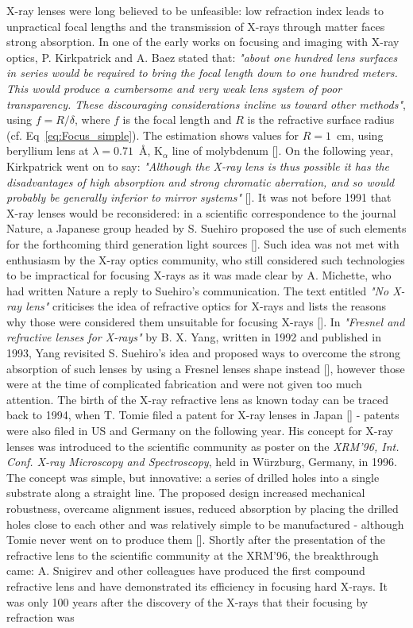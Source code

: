 \begin{refsection}
X-ray lenses were long believed to be unfeasible: low refraction index leads to unpractical focal lengths and the transmission of X-rays through matter faces strong absorption. In one of the early works on focusing and imaging with X-ray optics, P. Kirkpatrick and A. Baez stated that: \textit{"about one hundred lens surfaces in series would be required to bring the focal length down to one hundred meters. This would produce a cumbersome and very weak lens system of poor transparency. These discouraging considerations incline us toward other methods"}, using $f=R/\delta$, where $f$ is the focal length and $R$ is the refractive surface radius (cf. Eq~\ref{eq:Focus_simple}). The estimation shows values for $R=1$~cm, using beryllium lens at $\lambda=0.71$~\r{A}, K$_{\alpha}$ line of molybdenum [\cite{Kirkpatrick1948}]. On the following year, Kirkpatrick went on to say: \textit{"Although the X-ray lens is thus possible it has the disadvantages of high absorption and strong chromatic aberration, and so would probably be generally inferior to mirror systems"} [\cite{Kirkpatrick1949}]. It was not before 1991 that X-ray lenses would be reconsidered: in a scientific correspondence to the journal Nature, a Japanese group headed by S. Suehiro proposed the use of such elements for the forthcoming third generation light sources [\cite{Suehiro1991}]. Such idea was not met with enthusiasm by the X-ray optics community, who still considered such technologies to be impractical for focusing X-rays as it was made clear by A. Michette, who had written Nature a reply to Suehiro's communication. The text entitled \textit{"No X-ray lens"} criticises the idea of refractive optics for X-rays and lists the reasons why those were considered them unsuitable for focusing X-rays [\cite{Michette1991}]. In \textit{"Fresnel and refractive lenses for X-rays"} by B. X. Yang, written in 1992 and published in 1993, Yang revisited S. Suehiro's idea and proposed ways to overcome the strong absorption of such lenses by using a Fresnel lenses shape instead [\cite{Yang1993}], however those were at the time of complicated fabrication and were not given too much attention. The birth of the X-ray refractive lens as known today can be traced back to 1994, when T. Tomie filed a patent for X-ray lenses in Japan [\cite{Tomie1994}] - patents were also filed in US and Germany on the following year. His concept for X-ray lenses was introduced to the scientific community as poster on the \textit{XRM'96, Int. Conf. X-ray Microscopy and Spectroscopy}, held in W\"urzburg, Germany, in 1996. The concept was simple, but innovative: a series of drilled holes into a single substrate along a straight line. The proposed design increased mechanical robustness, overcame alignment issues, reduced absorption by placing the drilled holes close to each other and was relatively simple to be manufactured - although Tomie never went on to produce them [\cite{Tomie2010}]. Shortly after the presentation of the refractive lens to the scientific community at the XRM'96, the breakthrough came: A. Snigirev and other colleagues have produced the first compound refractive lens and have demonstrated its efficiency in focusing hard X-rays. It was only 100 years after the discovery of the X-rays that their focusing by refraction was 
\end{refsection}

